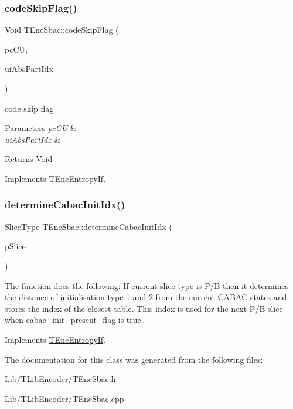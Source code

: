 \subsubsection{\texorpdfstring{code\+Skip\+Flag()}{codeSkipFlag()}}
{\footnotesize\ttfamily Void T\+Enc\+Sbac\+::code\+Skip\+Flag (\begin{DoxyParamCaption}\item[{\hyperlink{class_t_com_data_c_u}{T\+Com\+Data\+CU} $\ast$}]{pc\+CU,  }\item[{U\+Int}]{ui\+Abs\+Part\+Idx }\end{DoxyParamCaption})\hspace{0.3cm}{\ttfamily [virtual]}}

code skip flag 
\begin{DoxyParams}{Parameters}
{\em pc\+CU} & \\
\hline
{\em ui\+Abs\+Part\+Idx} & \\
\hline
\end{DoxyParams}
\begin{DoxyReturn}{Returns}
Void 
\end{DoxyReturn}


Implements \hyperlink{class_t_enc_entropy_if}{T\+Enc\+Entropy\+If}.

\mbox{\label{class_t_enc_sbac_ab9e99bf6ce44301fe50b9a8cc7ff5db7}} 
\subsubsection{\texorpdfstring{determine\+Cabac\+Init\+Idx()}{determineCabacInitIdx()}}
{\footnotesize\ttfamily \hyperlink{_type_def_8h_a8fc5fd31653a387f7430d29863620f71}{Slice\+Type} T\+Enc\+Sbac\+::determine\+Cabac\+Init\+Idx (\begin{DoxyParamCaption}\item[{const \hyperlink{class_t_com_slice}{T\+Com\+Slice} $\ast$}]{p\+Slice }\end{DoxyParamCaption})\hspace{0.3cm}{\ttfamily [virtual]}}

The function does the following\+: If current slice type is P/B then it determines the distance of initialisation type 1 and 2 from the current C\+A\+B\+AC states and stores the index of the closest table. This index is used for the next P/B slice when cabac\+\_\+init\+\_\+present\+\_\+flag is true. 

Implements \hyperlink{class_t_enc_entropy_if}{T\+Enc\+Entropy\+If}.



The documentation for this class was generated from the following files\+:\begin{DoxyCompactItemize}
\item 
Lib/\+T\+Lib\+Encoder/\hyperlink{_t_enc_sbac_8h}{T\+Enc\+Sbac.\+h}\item 
Lib/\+T\+Lib\+Encoder/\hyperlink{_t_enc_sbac_8cpp}{T\+Enc\+Sbac.\+cpp}\end{DoxyCompactItemize}
